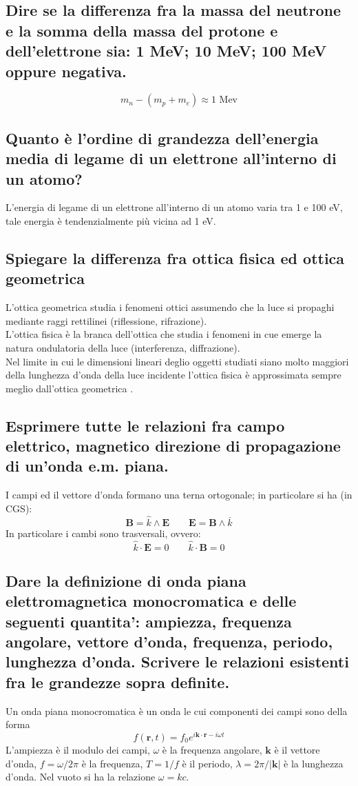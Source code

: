 \subsection[]{Dire se la differenza fra la massa del neutrone e la somma della massa del protone e dell’elettrone sia: 1 MeV; 10 MeV; 100 MeV oppure negativa.}
\[
	m_n - \left( m_p + m_e \right) \approx 1 \text{ Mev} 
\] 
\subsection[]{Quanto è l’ordine di grandezza dell’energia media di legame di un elettrone all’interno di un atomo?}
L'energia di legame di un elettrone all'interno di un atomo varia tra 1 e 100 eV, tale energia è tendenzialmente più vicina ad 1 eV.
\subsection[]{Spiegare la differenza fra ottica fisica ed ottica geometrica}
L'ottica geometrica studia i fenomeni ottici assumendo che la luce si propaghi mediante raggi rettilinei (riflessione, rifrazione).\\ 
L'ottica fisica è la branca dell'ottica che studia i fenomeni in cue emerge la natura ondulatoria della luce (interferenza, diffrazione).\\
Nel limite in cui le dimensioni lineari deglio oggetti studiati siano molto maggiori della lunghezza d'onda della luce incidente l'ottica fisica è approssimata sempre meglio dall'ottica geometrica .
\subsection[]{ Esprimere tutte le relazioni fra campo elettrico, magnetico direzione di propagazione di un’onda e.m. piana.}
I campi ed il vettore d'onda formano una terna ortogonale; in particolare si ha (in CGS):
\[
	\boldsymbol{B} = \hat{k} \wedge \boldsymbol{E} \quad \quad 
	\boldsymbol{E} = \boldsymbol{B} \wedge \overline{k} 
\] 
In particolare i cambi sono trasversali, ovvero:
\[
	\hat{k} \cdot \boldsymbol{E} = 0 \quad \quad 
	\hat{k} \cdot \boldsymbol{B} = 0
\] 

\subsection[]{ Dare la definizione di onda piana elettromagnetica monocromatica e delle seguenti quantita’: ampiezza, frequenza angolare, vettore d’onda, frequenza, periodo, lunghezza
d’onda. Scrivere le relazioni esistenti fra le grandezze sopra definite.}
Un onda piana monocromatica è un onda le cui componenti dei campi sono della forma 
\[
	f\left( \boldsymbol{r}, t \right) = f_{0} e^{i \boldsymbol{k} \cdot \boldsymbol{r} - i \omega t }
\] 
L'ampiezza è il modulo dei campi, $\omega$ è la frequenza angolare, $\boldsymbol{k}$ è il vettore d'onda, $f = \omega/2\pi$ è la frequenza, $T = 1/f$ è il periodo, $\lambda = 2\pi/\boldsymbol{|k|}$ è la lunghezza d'onda. Nel vuoto si ha la relazione $\omega = k c$.

